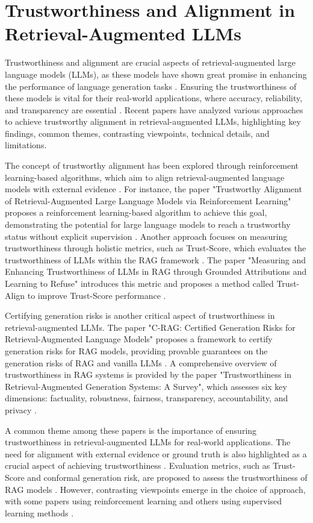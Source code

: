\documentclass[conference]{IEEEtran}
\begin{document}
\section{Trustworthiness and Alignment in Retrieval-Augmented LLMs}
Trustworthiness and alignment are crucial aspects of retrieval-augmented large language models (LLMs), as these models have shown great promise in enhancing the performance of language generation tasks \cite{b1}. Ensuring the trustworthiness of these models is vital for their real-world applications, where accuracy, reliability, and transparency are essential \cite{b2}. Recent papers have analyzed various approaches to achieve trustworthy alignment in retrieval-augmented LLMs, highlighting key findings, common themes, contrasting viewpoints, technical details, and limitations.

The concept of trustworthy alignment has been explored through reinforcement learning-based algorithms, which aim to align retrieval-augmented language models with external evidence \cite{b3}. For instance, the paper "Trustworthy Alignment of Retrieval-Augmented Large Language Models via Reinforcement Learning" proposes a reinforcement learning-based algorithm to achieve this goal, demonstrating the potential for large language models to reach a trustworthy status without explicit supervision \cite{b4}. Another approach focuses on measuring trustworthiness through holistic metrics, such as Trust-Score, which evaluates the trustworthiness of LLMs within the RAG framework \cite{b5}. The paper "Measuring and Enhancing Trustworthiness of LLMs in RAG through Grounded Attributions and Learning to Refuse" introduces this metric and proposes a method called Trust-Align to improve Trust-Score performance \cite{b6}.

Certifying generation risks is another critical aspect of trustworthiness in retrieval-augmented LLMs. The paper "C-RAG: Certified Generation Risks for Retrieval-Augmented Language Models" proposes a framework to certify generation risks for RAG models, providing provable guarantees on the generation risks of RAG and vanilla LLMs \cite{b7}. A comprehensive overview of trustworthiness in RAG systems is provided by the paper "Trustworthiness in Retrieval-Augmented Generation Systems: A Survey", which assesses six key dimensions: factuality, robustness, fairness, transparency, accountability, and privacy \cite{b8}.

A common theme among these papers is the importance of ensuring trustworthiness in retrieval-augmented LLMs for real-world applications. The need for alignment with external evidence or ground truth is also highlighted as a crucial aspect of achieving trustworthiness \cite{b9}. Evaluation metrics, such as Trust-Score and conformal generation risk, are proposed to assess the trustworthiness of RAG models \cite{b10}. However, contrasting viewpoints emerge in the choice of approach, with some papers using reinforcement learning \cite{b11} and others using supervised learning methods \cite{b12}.
\end{document}

